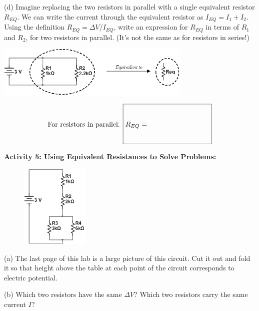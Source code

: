 (d) Imagine replacing the two resistors in parallel with a single equivalent resistor $R_{EQ}$.   We can write the current through the equivalent resistor as $I_{EQ}=I_1+I_2$.  Using the definition $R_{EQ}=  \Delta V \slash I_{EQ}$, write an expression for $R_{EQ}$ in terms of $R_1$ and $R_2$, for two resistors in parallel.  (It's not the same as for resistors in series!)

\begin{center}
\includegraphics[width=0.7\textwidth]{electric_circuits2/parallel_equiv_bw.eps}
\answerspace{1 in}
\end{center}

\begin{displaymath}
\textrm{For resistors in parallel: } \boxed{R_{EQ} = \phantom{\rule[-0.3in]{1.2in}{.7in}}} 
\end{displaymath}

\textbf{Activity 5: Using Equivalent Resistances to Solve Problems:}

\begin{figure}
    \vspace{-0.3 in}
    \includegraphics[width=0.29\textwidth]{electric_circuits2/circ_diag6_bw.eps}
\end{figure}

(a) The last page of this lab is a large picture of this circuit.  Cut it out and fold it so that height above the table at each point of the circuit corresponds to electric potential.  

(b) Which two resistors have the same $\Delta V$?  Which two resistors carry the same current $I$?
\answerspace{0.6 in}

